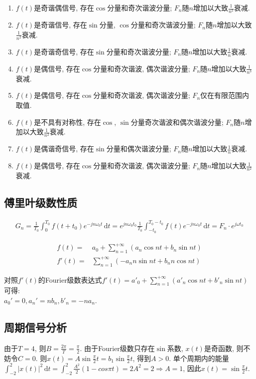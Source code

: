 \begin{enumerate}
    \item $f(t)$是奇谐偶信号, 存在$\cos$分量和奇次谐波分量; $F_n$随$n$增加以大致$\frac{1}{n^2}$衰减.
    \item $f(t)$是奇谐信号, 存在$\sin$分量, $\cos$分量和奇次谐波分量; $F_n$随$n$增加以大致$\frac{1}{n^2}$衰减.
    \item $f(t)$是奇谐奇信号, 存在$\sin$分量和奇次谐波分量; $F_n$随$n$增加以大致$\frac{1}{n}$衰减.
    \item $f(t)$是偶信号, 存在$\cos$分量和奇次谐波, 偶次谐波分量; $F_n$随$n$增加以大致$\frac{1}{n^3}$衰减.
    \item $f(t)$是偶信号, 存在$\cos$分量和奇次谐波, 偶次谐波分量; $F_n$仅在有限范围内取值.
    \item $f(t)$是不具有对称性, 存在$\cos$, $\sin$分量奇次谐波和偶次谐波分量; $F_n$随$n$增加以大致$\frac{1}{n^2}$衰减.
    \item $f(t)$是偶谐奇信号, 存在$\sin$分量和偶次谐波分量; $F_n$随$n$增加以大致$\frac{1}{n}$衰减.
    \item $f(t)$是偶信号, 存在$\cos$分量和奇次谐波, 偶次谐波分量; $F_n$随$n$增加以大致$\frac{1}{n^2}$衰减.
\end{enumerate}

\subsection{傅里叶级数性质}


\begin{align*}
    G_n=\frac{1}{T_0}\int_{0}^{T_0}f(t+t_0)e^{-jn\omega_0t}\,\mathrm{d}t=e^{jn\omega_0t_0}\frac{1}{T_0}\int_{-t_0}^{T_0-t_0}f(t)e^{-jn\omega_0t}\,\mathrm{d}t=F_n\cdot e^{j\omega t_0}
\end{align*}


\begin{align*}
    f(t)=&a_0+\sum_{n=1}^{+\infty}(a_n\cos nt+b_n\sin nt) \\
    f'(t)=&\sum_{n=1}^{+\infty}(-a_nn\sin nt + b_nn \cos nt)
\end{align*}

对照$f'(t)$的Fourier级数表达式$\displaystyle f'(t)=a'_0+\sum_{n=1}^{+\infty}(a'_n\cos nt+b'_n\sin nt)$可得:\\
$a_0'=0,a_n'=nb_n,b'_n=-na_n$.

\subsection{周期信号分析}

由于$T=4$, 则$B=\frac{2\pi}{T}=\frac{\pi}{2}$. 由于Fourier级数只存在$\sin$系数, $x(t)$是奇函数, 则不妨令$C=0$. 
则$x(t)=A\sin\frac{\pi}{2}t=b_1\sin\frac{\pi}{2}t$, 得到$A>0$. 单个周期内的能量$\displaystyle \int_{-2}^{2}|x(t)|^2\,\mathrm{d}t=\int_{-2}^{2}\frac{A^2}{2}(1-cos\pi t)=2A^2=2\Rightarrow A=1$, 因此$x(t)=\sin\frac{\pi}{2}t$.